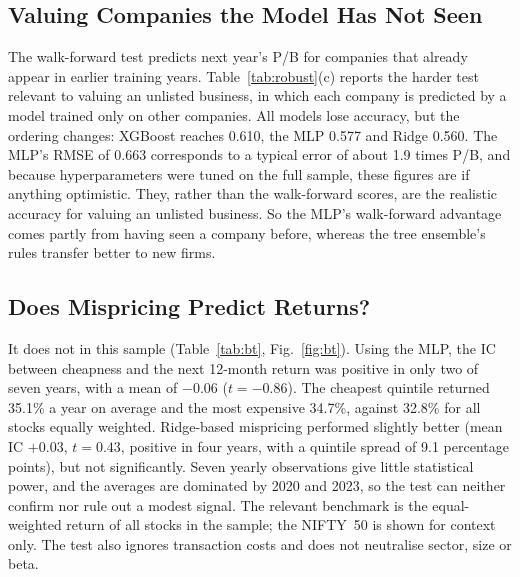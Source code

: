 \documentclass[conference]{IEEEtran}
\begin{document}
\subsection{Valuing Companies the Model Has Not Seen}
The walk-forward test predicts next year's P/B for companies that already appear in earlier training years. Table~\ref{tab:robust}(c) reports the harder test relevant to valuing an unlisted business, in which each company is predicted by a model trained only on other companies. All models lose accuracy, but the ordering changes: XGBoost reaches 0.610, the MLP 0.577 and Ridge 0.560. The MLP's RMSE of 0.663 corresponds to a typical error of about 1.9 times P/B, and because hyperparameters were tuned on the full sample, these figures are if anything optimistic. They, rather than the walk-forward scores, are the realistic accuracy for valuing an unlisted business. So the MLP's walk-forward advantage comes partly from having seen a company before, whereas the tree ensemble's rules transfer better to new firms.

\subsection{Does Mispricing Predict Returns?}
It does not in this sample (Table~\ref{tab:bt}, Fig.~\ref{fig:bt}). Using the MLP, the IC between cheapness and the next 12-month return was positive in only two of seven years, with a mean of $-0.06$ ($t=-0.86$). The cheapest quintile returned 35.1\% a year on average and the most expensive 34.7\%, against 32.8\% for all stocks equally weighted. Ridge-based mispricing performed slightly better (mean IC $+0.03$, $t=0.43$, positive in four years, with a quintile spread of 9.1 percentage points), but not significantly. Seven yearly observations give little statistical power, and the averages are dominated by 2020 and 2023, so the test can neither confirm nor rule out a modest signal. The relevant benchmark is the equal-weighted return of all stocks in the sample; the NIFTY~50 is shown for context only. The test also ignores transaction costs and does not neutralise sector, size or beta.
\end{document}
